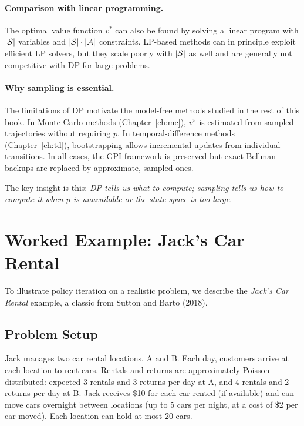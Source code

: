 \paragraph{Comparison with linear programming.}
The optimal value function $v^*$ can also be found by solving a linear program with $|\mathcal{S}|$ variables and $|\mathcal{S}| \cdot |\mathcal{A}|$ constraints.  LP-based methods can in principle exploit efficient LP solvers, but they scale poorly with $|\mathcal{S}|$ as well and are generally not competitive with DP for large problems.

\paragraph{Why sampling is essential.}
The limitations of DP motivate the model-free methods studied in the rest of this book.  In Monte Carlo methods (Chapter~\ref{ch:mc}), $v^\pi$ is estimated from sampled trajectories without requiring $p$.  In temporal-difference methods (Chapter~\ref{ch:td}), bootstrapping allows incremental updates from individual transitions.  In all cases, the GPI framework is preserved but exact Bellman backups are replaced by approximate, sampled ones.

The key insight is this: \emph{DP tells us what to compute; sampling tells us how to compute it when $p$ is unavailable or the state space is too large}.

\section{Worked Example: Jack's Car Rental}
\label{sec:car-rental}

To illustrate policy iteration on a realistic problem, we describe the \emph{Jack's Car Rental} example, a classic from Sutton and Barto (2018).

\subsection*{Problem Setup}

Jack manages two car rental locations, A and B.  Each day, customers arrive at each location to rent cars.  Rentals and returns are approximately Poisson distributed: expected 3 rentals and 3 returns per day at A, and 4 rentals and 2 returns per day at B.  Jack receives \$10 for each car rented (if available) and can move cars overnight between locations (up to 5 cars per night, at a cost of \$2 per car moved).  Each location can hold at most 20 cars.

